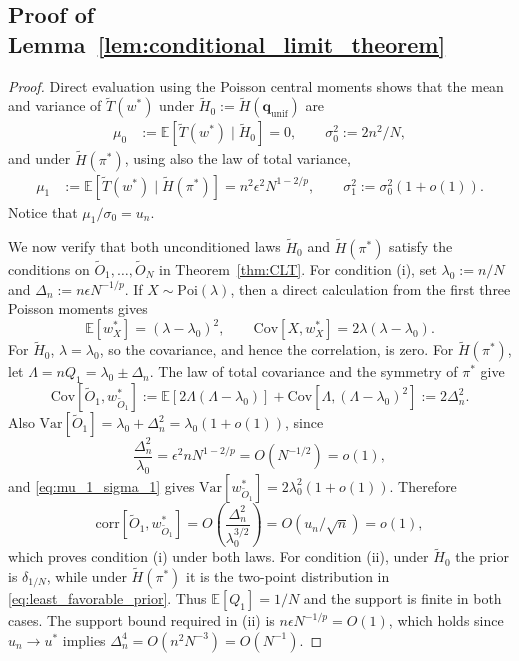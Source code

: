 \documentclass[11pt]{article}
\numberwithin{equation}{section}
\newcommand{\unif}{\mathrm{unif}}
\newcommand{\Pois}{\mathrm{Poi}}
\newcommand{\Var}[1]{\mathrm{Var}\left[ #1\right]}
\newcommand{\ex}[1]{\ensuremath{\mathbb{E}\left[ #1\right]}}
\newcommand{\Cov}[1]{\mathrm{Cov} \left[#1\right]}
\newcommand{\Corr}[1]{\mathrm{corr} \left[#1\right]}
\begin{document}
\subsection{Proof of Lemma~\ref{lem:conditional_limit_theorem}}
\label{sec:proof_conditional_limit_theorem}
\begin{proof}
Direct evaluation using the Poisson central moments shows that the mean and variance of $\tilde{T}(w^*)$ under $\tilde{H}_0 := \tilde{H}(\mathbf{q}_{\unif})$ are 
\begin{align}
    \label{eq:mu_0_sigma_0}
     \mu_0 &:= \ex{\tilde{T}(w^*)\mid \tilde{H}_0} = 0, \qquad
     \sigma_0^2 := 2 n^2 / N,
 \end{align}
 and under $\tilde{H}(\pi^*)$, using also the law of total variance, 
 \begin{align}
    \label{eq:mu_1_sigma_1}
     \mu_1 &:= \ex{\tilde{T}(w^*)\mid \tilde{H}(\pi^*)} = n^2 \epsilon^2 N^{1-2/p}, \qquad \sigma_1^2 := \sigma_0^2(1+o(1)).
 \end{align}
 Notice that $\mu_1/\sigma_0 = u_n$.
 
 We now verify that both unconditioned laws $\tilde{H}_0$ and $\tilde{H}(\pi^*)$ satisfy the conditions on $\tilde{O}_1,\ldots,\tilde{O}_N$ in Theorem~\ref{thm:CLT}. 
%
For condition (i), set $\lambda_0:=n/N$ and $\Delta_n:=n\epsilon N^{-1/p}$. If $X\sim\Pois(\lambda)$, then a direct calculation from the first three Poisson moments gives
\[
\ex{w_X^*}=(\lambda-\lambda_0)^2,\qquad
\Cov{X,w_X^*}=2\lambda(\lambda-\lambda_0).
\]
For $\tilde{H}_0$, $\lambda=\lambda_0$, so the covariance, and hence the correlation, is zero. For $\tilde{H}(\pi^*)$, let $\Lambda=nQ_1=\lambda_0\pm\Delta_n$. The law of total covariance and the symmetry of $\pi^*$ give
\[
\Cov{\tilde{O}_1,w^*_{\tilde{O}_1}}
:=\ex{2\Lambda(\Lambda-\lambda_0)}
    +\Cov{\Lambda,(\Lambda-\lambda_0)^2}
:=2\Delta_n^2.
\]
Also $\Var{\tilde{O}_1}=\lambda_0+\Delta_n^2=\lambda_0(1+o(1))$, since
\[
\frac{\Delta_n^2}{\lambda_0}=\epsilon^2 nN^{1-2/p}=O(N^{-1/2})=o(1),
\]
and \eqref{eq:mu_1_sigma_1} gives $\Var{w^*_{\tilde{O}_1}}=2\lambda_0^2(1+o(1))$. Therefore
\[
\Corr{\tilde{O}_1,w^*_{\tilde{O}_1}}
=O\left(\frac{\Delta_n^2}{\lambda_0^{3/2}}\right)
=O(u_n/\sqrt{n})=o(1),
\]
which proves condition (i) under both laws.
% 
For condition (ii), under $\tilde{H}_0$ the prior is $\delta_{1/N}$, while under $\tilde{H}(\pi^*)$ it is the two-point distribution in \eqref{eq:least_favorable_prior}. Thus $\ex{Q_1}=1/N$ and the support is finite in both cases. The support bound required in (ii) is $n \epsilon N^{-1/p} =O(1)$, which holds since $u_n \to u^*$ implies $\Delta_n^4 = O(n^2 N^{-3}) = O(N^{-1})$. 


\end{proof}
\end{document}

